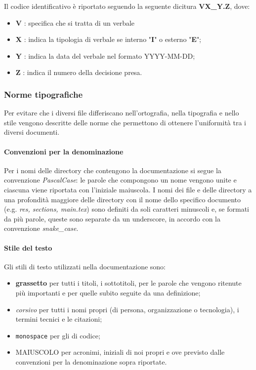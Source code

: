 Il codice identificativo è riportato seguendo la seguente dicitura \textbf{VX_Y.Z}, dove:
\begin{itemize}
    \item\textbf{V} : specifica che si tratta di un verbale
	\item\textbf{X} : indica la tipologia di verbale se interno "\textbf{I}" o esterno "\textbf{E}";
	\item\textbf{Y} : indica la data del verbale nel formato YYYY-MM-DD; %
	\item\textbf{Z} : indica il numero della decisione presa.
\end{itemize}
    
\subsubsection{Norme tipografiche} \label{_normetipografiche}
Per evitare che i diversi file differiscano nell'ortografia, nella tipografia e nello stile vengono descritte delle norme che permettono di ottenere l'uniformità tra i diversi documenti.

\paragraph{Convenzioni per la denominazione}
Per i nomi delle directory che contengono la documentazione si segue la convenzione \textit{PascalCase}: le parole che compongono un nome vengono unite e ciascuna viene riportata con l'iniziale maiuscola. I nomi dei file  e delle directory a una profondità maggiore delle directory con il nome dello specifico documento (e.g. \textit{res, sections, main.tex}) sono definiti da soli caratteri minuscoli e, se formati da più parole, queste sono separate da un underscore, in accordo con la convenzione \textit{snake\_case}.

\paragraph{Stile del testo}
Gli stili di testo utilizzati nella documentazione sono:
\begin{itemize}
\item\textbf{grassetto} per tutti i titoli, i sottotitoli, per le parole che vengono ritenute più importanti e per quelle subito seguite da una definizione;
\item \textit{corsivo} per tutti i nomi propri (di persona, organizzazione o tecnologia), i termini tecnici e le citazioni;
\item \texttt{monospace} per gli  di codice;
\item MAIUSCOLO per acronimi, iniziali di noi propri e ove previsto dalle convenzioni per la denominazione sopra riportate.
\end{itemize}

